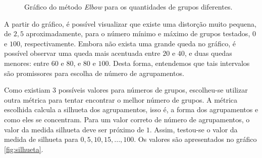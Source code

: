 \documentclass[conference]{IEEEtran}
\begin{document}
\begin{figure}[!h]
	\centering
	{
	}
	\caption{\small Gráfico do método \emph{Elbow} para os quantidades de grupos diferentes.}
	\label{fig:elbow}
\end{figure}

A partir do gráfico, é possível visualizar que existe uma distorção muito pequena, de $2,5$ aproximadamente, para o número mínimo e máximo de grupos testados, $0$ e $100$, respectivamente. Embora não exista uma grande queda no gráfico, é possível observar uma queda mais acentuada entre $20$ e $40$, e duas quedas menores: entre $60$ e $80$, e $80$ e $100$. Desta forma, entendemos que tais intervalos são promissores para escolha de número de agrupamentos.

Como existiam 3 possíveis valores para números de grupos, escolheu-se utilizar outra métrica para tentar encontrar o melhor número de grupos. A métrica escolhida calcula a silhueta dos agrupamentos, isso é, a forma dos agrupamentos e como eles se concentram. Para um valor correto de número de agrupamentos, o valor da medida silhueta deve ser próximo de $1$. Assim, testou-se o valor da medida de silhueta para $0, 5, 10, 15, ..., 100$. Os valores são apresentados no gráfico \ref{fig:silhueta}.
\end{document}
